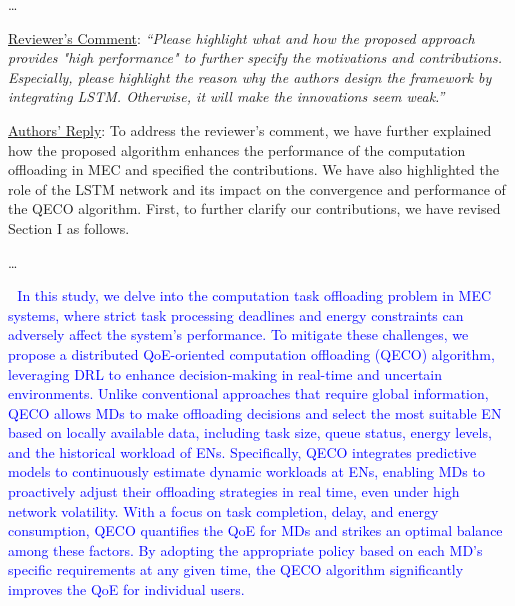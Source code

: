 \documentclass[12pt,draftclsnofoot,onecolumn]{IEEEtran}
\newcommand{\rev}[1]{{\color{blue}#1}} %
\newcommand{\rev}[1]{#1}
\newenvironment{my}[2]%
{\begin{list}{}%
{\setlength{\rightmargin}{#1}\setlength{\leftmargin}{#2}}%


 \item[]{}

} {\end{list}}
\begin{document}
\begin{enumerate}
\begin{my}{1cm}{1cm}
{\dots

 }
\end{my}



\vspace{6mm}

\item \underline{Reviewer's Comment}: 
\textit{``Please highlight what and how the proposed approach provides "high performance" to further specify the motivations and contributions. Especially, please highlight the reason why the authors design the framework by integrating LSTM. Otherwise, it will make the innovations seem weak.''} \newline

\underline{Authors' Reply}: To address the reviewer’s comment, we have further explained how the proposed algorithm enhances the performance of the computation offloading in MEC and specified the contributions. We have also highlighted the role of the LSTM network and its impact on the convergence and performance of the QECO algorithm. First, to further clarify our contributions, we have revised Section I as follows.

		\begin{my}{1cm}{1cm}
	\rev{
		{\dots\
			
			
			\textcolor{blue}{\,\,\,\,In this study, we delve into the computation task offloading problem in MEC systems, where strict task processing deadlines and energy constraints can adversely affect the system's performance. To mitigate these challenges, we propose a distributed QoE-oriented computation offloading (QECO) algorithm, leveraging DRL to enhance decision-making in real-time and uncertain environments. Unlike conventional approaches that require global information, QECO allows MDs to make offloading decisions and select the most suitable EN based on locally available data, including task size, queue status, energy levels, and the historical workload of ENs. Specifically, QECO integrates predictive models to continuously estimate dynamic workloads at ENs, enabling MDs to proactively adjust their offloading strategies in real time, even under high network volatility. With a focus on task completion, delay, and energy consumption, QECO quantifies the QoE for MDs and strikes an optimal balance among these factors. By adopting the appropriate policy based on each MD’s specific requirements at any given time, the QECO algorithm significantly improves the QoE for individual users.} \vspace{2mm}

}}
\end{my}
\end{enumerate}
\end{document}
